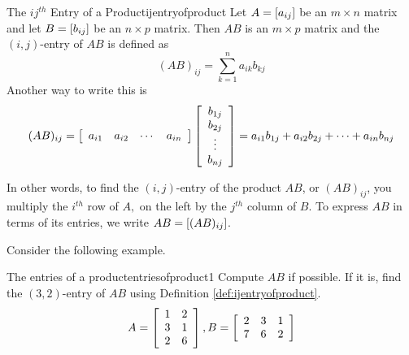 \begin{definition}{The $ij^{th}$ Entry of a Product}{ijentryofproduct}
Let $A=\left[ a_{ij}\right] $ be an $m\times n$ matrix and
let $B=\left[ b_{ij}\right] $ be an $n\times p$ matrix. Then $AB$ is an 
$m\times p$ matrix and the $\left( i, j \right)$-entry of $AB$ is defined as 
\begin{equation*}
(AB)_{ij}=\sum_{k=1}^{n}a_{ik}b_{kj}  
\end{equation*}
Another way to write this is
\begin{equation*}
(AB)_{ij}=\left[
\begin{array}{cccc}
a_{i1} & a_{i2} & \cdots & a_{in}
\end{array}
\right] \left[
\begin{array}{c}
b_{1j} \\
b_{2j} \\
\vdots \\
b_{nj}
\end{array}
\right]
= 
a_{i1}b_{1j} + a_{i2}b_{2j} + \cdots + a_{in}b_{nj}
\end{equation*}
\end{definition}

In other words, to find the $\left( i, j \right)$-entry of the product $AB$, or $(AB)_{ij}$,
you multiply the $i^{th}$ row of 
$A,$ on the left by the $j^{th}$ column of $B$. To express $AB$ in terms of its entries, we write $AB = \left[ (AB)_{ij} \right]$.

Consider the following example. 

\begin{example}{The entries of a product}{entriesofproduct1}
Compute $AB$ if possible. If it is, find the $\left( 3,2 \right)$-entry of $AB$ using Definition \ref{def:ijentryofproduct}. 
\begin{equation*}
A = \left[
\begin{array}{cc}
1 & 2 \\
3 & 1 \\
2 & 6
\end{array}
\right], B = \left[
\begin{array}{ccc}
2 & 3 & 1 \\
7 & 6 & 2
\end{array}
\right]
\end{equation*}
\end{example}

